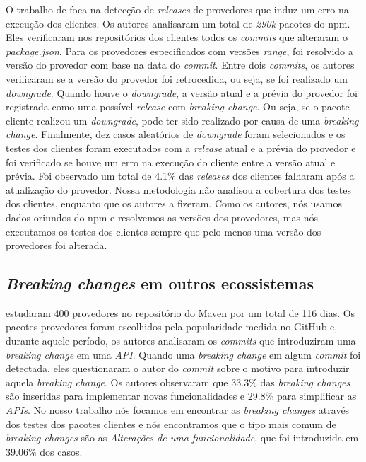 O trabalho de  foca na detecção de \textit{releases} de provedores que induz um erro na execução dos clientes. Os autores analisaram um total de \textit{290k} pacotes do \textsf{npm}. Eles verificaram nos repositórios dos clientes todos os \textit{commits} que alteraram o \textit{package.json}. Para os provedores especificados com versões \textit{range}, foi resolvido a versão do provedor com base na data do \textit{commit}. Entre dois \textit{commits}, os autores verificaram se a versão do provedor foi retrocedida, ou seja, se foi realizado um \textit{downgrade}. Quando houve o \textit{downgrade}, a versão atual e a prévia do provedor foi registrada como uma possível \textit{release} com \textit{breaking change}. Ou seja, se o pacote cliente realizou um \textit{downgrade}, pode ter sido realizado por causa de uma \textit{breaking change}. Finalmente, dez casos aleatórios de \textit{downgrade} foram selecionados e os testes dos clientes foram executados com a \textit{release} atual e a prévia do provedor e foi verificado se houve um erro na execução do cliente entre a versão atual e prévia. Foi observado um total de 4.1\% das \textit{releases} dos clientes falharam após a atualização do provedor. Nossa metodologia não analisou a cobertura dos testes dos clientes, enquanto que os autores a fizeram. Como os autores, nós usamos dados oriundos do \textsf{npm} e resolvemos as versões dos provedores, mas nós executamos os testes dos clientes sempre que pelo menos uma versão dos provedores foi alterada.

\subsection{\textit{Breaking changes} em outros ecossistemas}
\label{sub:related:others}
 estudaram 400 provedores no repositório do \textsf{Maven} por um total de 116 dias. Os pacotes provedores foram escolhidos pela popularidade medida no \textsf{GitHub} e, durante aquele período, os autores analisaram os \textit{commits} que introduziram uma \textit{breaking change} em uma \textit{API}. Quando uma \textit{breaking change} em algum \textit{commit} foi detectada, eles questionaram o autor do \textit{commit} sobre o motivo para introduzir aquela \textit{breaking change}. Os autores observaram que 33.3\% das \textit{breaking changes} são inseridas para implementar novas funcionalidades e 29.8\% para simplificar as \textit{APIs}. No nosso trabalho nós focamos em encontrar as \textit{breaking changes} através dos testes dos pacotes clientes e nós encontramos que o tipo mais comum de \textit{breaking changes} são as \textit{Alterações de uma funcionalidade}, que foi introduzida em 39.06\% dos casos.

